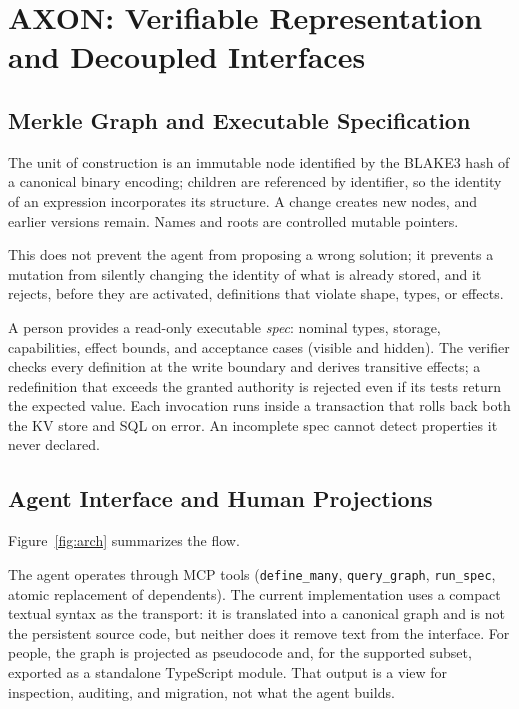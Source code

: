 \documentclass[11pt, a4paper]{article}
\begin{document}
\section{AXON: Verifiable Representation and Decoupled Interfaces}
\label{sec:axon}

\subsection{Merkle Graph and Executable Specification}

The unit of construction is an immutable node identified by the BLAKE3 hash of a canonical binary encoding; children are referenced by identifier, so the identity of an expression incorporates its structure. A change creates new nodes, and earlier versions remain. Names and roots are controlled mutable pointers.

This does not prevent the agent from proposing a wrong solution; it prevents a mutation from silently changing the identity of what is already stored, and it rejects, before they are activated, definitions that violate shape, types, or effects.

A person provides a read-only executable \emph{spec}: nominal types, storage, capabilities, effect bounds, and acceptance cases (visible and hidden). The verifier checks every definition at the write boundary and derives transitive effects; a redefinition that exceeds the granted authority is rejected even if its tests return the expected value. Each invocation runs inside a transaction that rolls back both the KV store and SQL on error. An incomplete spec cannot detect properties it never declared.

\subsection{Agent Interface and Human Projections}

Figure~\ref{fig:arch} summarizes the flow.

The agent operates through MCP tools (\texttt{define\_many}, \texttt{query\_graph}, \texttt{run\_spec}, atomic replacement of dependents). The current implementation uses a compact textual syntax as the transport: it is translated into a canonical graph and is not the persistent source code, but neither does it remove text from the interface. For people, the graph is projected as pseudocode and, for the supported subset, exported as a standalone TypeScript module. That output is a view for inspection, auditing, and migration, not what the agent builds.
\end{document}
